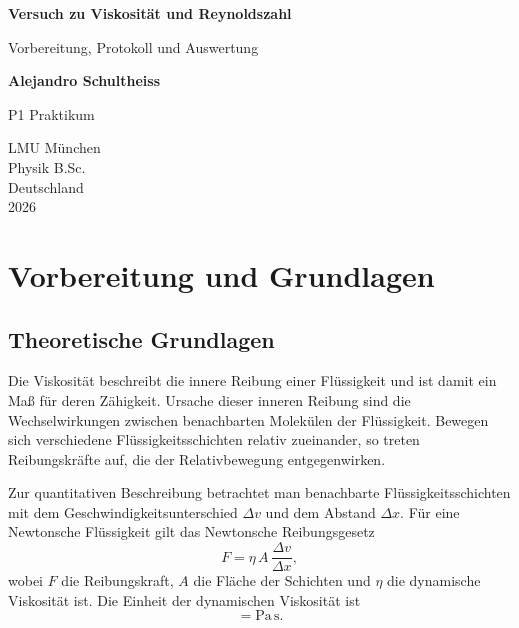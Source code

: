 \documentclass{report}
\begin{document}
\begin{titlepage}
    \begin{center}
        \vspace*{1cm}
            
        \Huge
        \textbf{Versuch zu Viskosität und Reynoldszahl}
            
        \vspace{0.5cm}
        \LARGE
        Vorbereitung, Protokoll und Auswertung
        
        \vspace{1.8cm}

        \textbf{Alejandro Schultheiss}
        \vfill
            
        P1 Praktikum\\
       
            
        \vspace{0.8cm}
  

        \vspace{1.8cm}
        \Large
        LMU München \\
        Physik B.Sc.\\
        Deutschland\\
        2026
            
    \end{center}
\end{titlepage}
\tableofcontents

\newpage
\chapter{Vorbereitung und Grundlagen}

\section{Theoretische Grundlagen}

Die Viskosität beschreibt die innere Reibung einer Flüssigkeit und ist damit ein Maß für deren
Zähigkeit. Ursache dieser inneren Reibung sind die Wechselwirkungen zwischen benachbarten
Molekülen der Flüssigkeit. Bewegen sich verschiedene Flüssigkeitsschichten relativ zueinander,
so treten Reibungskräfte auf, die der Relativbewegung entgegenwirken.

\noindent
Zur quantitativen Beschreibung betrachtet man benachbarte Flüssigkeitsschichten mit dem
Geschwindigkeitsunterschied $\Delta v$ und dem Abstand $\Delta x$. Für eine Newtonsche
Flüssigkeit gilt das Newtonsche Reibungsgesetz
\begin{equation}
    F = \eta \, A \, \frac{\Delta v}{\Delta x},
\end{equation}
wobei $F$ die Reibungskraft, $A$ die Fläche der Schichten und $\eta$ die dynamische
Viskosität ist. Die Einheit der dynamischen Viskosität ist
\begin{equation}
    [\eta] = \mathrm{Pa\,s}.
\end{equation}
\end{document}
